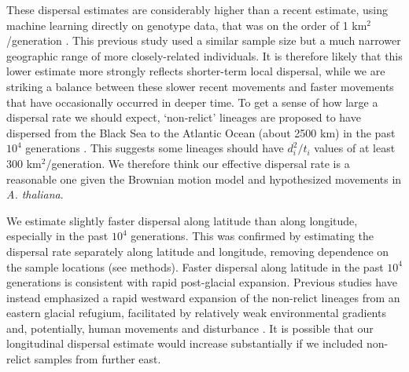 \documentclass[12pt]{article}
\begin{document}
These dispersal estimates are considerably higher than a recent estimate, using machine learning directly on genotype data, that was on the order of 1 km$^2$/generation \citep{smith2023dispersal}. This previous study used a similar sample size but a much narrower geographic range of more closely-related individuals. It is therefore likely that this lower estimate more strongly reflects shorter-term local dispersal, while we are striking a balance between these slower recent movements and faster movements that have occasionally occurred in deeper time. To get a sense of how large a dispersal rate we should expect, `non-relict' lineages are proposed to have dispersed from the Black Sea to the Atlantic Ocean (about 2500 km) in the past $10^4$ generations \citep{lee2017post,hsu2019postglacial}. This suggests some lineages should have $d_i^2/t_i$ values of at least 300 km$^2$/generation. We therefore think our effective dispersal rate is a reasonable one given the Brownian motion model and hypothesized movements in \textit{A. thaliana}.

We estimate slightly faster dispersal along latitude than along longitude, especially in the past $10^4$ generations. This was confirmed by estimating the dispersal rate separately along latitude and longitude, removing dependence on the sample locations (see methods). Faster dispersal along latitude in the past $10^4$ generations is consistent with rapid post-glacial expansion. Previous studies have instead emphasized a rapid westward expansion of the non-relict lineages from an eastern glacial refugium, facilitated by relatively weak environmental gradients and, potentially, human movements and disturbance \citep{alonso2016,lee2017post,hsu2019postglacial}. It is possible that our longitudinal dispersal estimate would increase substantially if we included non-relict samples from further east.

\end{document}
